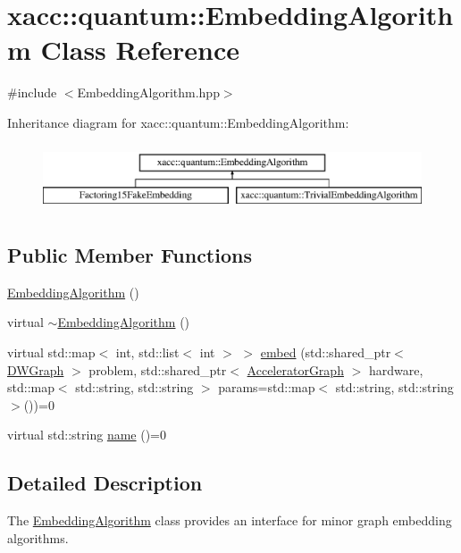 \hypertarget{a00037}{}\section{xacc\+:\+:quantum\+:\+:Embedding\+Algorithm Class Reference}
\label{a00037}


{\ttfamily \#include $<$Embedding\+Algorithm.\+hpp$>$}

Inheritance diagram for xacc\+:\+:quantum\+:\+:Embedding\+Algorithm\+:\begin{figure}[H]
\begin{center}
\leavevmode
\includegraphics[height=2.000000cm]{a00037}
\end{center}
\end{figure}
\subsection*{Public Member Functions}
\begin{DoxyCompactItemize}
\item 
\hyperlink{a00037_abad06507eef6b63af0884e3a96145c69}{Embedding\+Algorithm} ()
\item 
virtual \hyperlink{a00037_aa43660ad5d4c4b3ac67863892c33dc51}{$\sim$\+Embedding\+Algorithm} ()
\item 
virtual std\+::map$<$ int, std\+::list$<$ int $>$ $>$ \hyperlink{a00037_a6fca277e217884ff79802770189276fe}{embed} (std\+::shared\+\_\+ptr$<$ \hyperlink{a00030}{D\+W\+Graph} $>$ problem, std\+::shared\+\_\+ptr$<$ \hyperlink{a00044}{Accelerator\+Graph} $>$ hardware, std\+::map$<$ std\+::string, std\+::string $>$ params=std\+::map$<$ std\+::string, std\+::string $>$())=0
\item 
virtual std\+::string \hyperlink{a00037_a21079dc8ee37792977f5fd209e3f3b19}{name} ()=0
\end{DoxyCompactItemize}


\subsection{Detailed Description}
The \hyperlink{a00037}{Embedding\+Algorithm} class provides an interface for minor graph embedding algorithms. 

